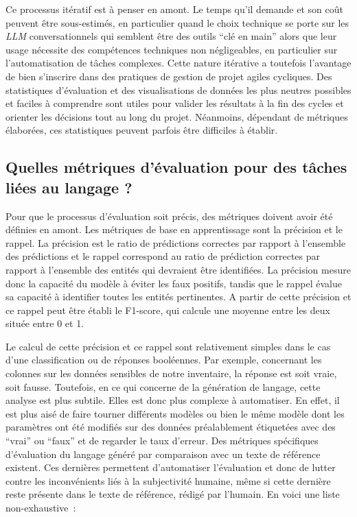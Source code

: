 Ce processus itératif est à penser en amont. Le temps qu'il demande et son coût peuvent être sous-estimés, en particulier quand le choix technique se porte sur les \emph{LLM} conversationnels qui semblent être des outils \enquote{clé en main} alors que leur usage nécessite des compétences techniques non négligeables, en particulier sur l'automatisation de tâches complexes. 
Cette nature itérative a toutefois l'avantage de bien s'inscrire dans des pratiques de gestion de projet agiles cycliques.
Des statistiques d'évaluation et des visualisations de données les plus neutres possibles et faciles à comprendre sont
utiles pour valider les résultats à la fin des cycles et orienter les décisions tout au long du projet.
Néanmoins, dépendant de métriques élaborées, ces statistiques peuvent parfois être difficiles à établir.


\subsection{Quelles métriques d'évaluation pour des tâches liées au langage ?}

Pour que le processus d'évaluation soit précis, des métriques doivent avoir été définies en amont.
Les métriques de base en \gls{apprentissage} sont la \gls{précision} et le \gls{rappel}. La \gls{précision} est le ratio
de prédictions correctes par rapport à l'ensemble des prédictions et le
\gls{rappel} correspond au ratio de prédiction correctes par rapport à l'ensemble des
entités qui devraient être identifiées. La précision mesure donc la
capacité du modèle à éviter les faux positifs, tandis que le rappel
évalue sa capacité à identifier toutes les entités pertinentes. A partir de cette précision et ce rappel
peut être établi le \gls{F1-score}, qui calcule une moyenne entre les deux située entre 0 et 1.

Le calcul de cette précision et ce rappel sont relativement simples dans le cas d'une classification ou de réponses booléennes. 
Par exemple, concernant les colonnes sur les données sensibles de notre inventaire, la réponse est soit vraie, soit fausse.
Toutefois, en ce qui concerne de la génération de langage, cette analyse est plus subtile. Elles est donc plus complexe à automatiser.
En effet, il est plus aisé de faire tourner différents modèles ou bien le même modèle dont les paramètres ont été modifiés
sur des données préalablement étiquetées avec des \enquote{vrai} ou \enquote{faux} et de regarder le taux d'erreur.
Des métriques spécifiques d'évaluation du langage généré par comparaison avec un texte de référence existent. Ces dernières permettent d'automatiser l'évaluation et donc de lutter contre les inconvénients liés à la subjectivité humaine, même si cette dernière reste présente dans le texte de référence, rédigé par l'humain. En voici une liste non-exhaustive~:

